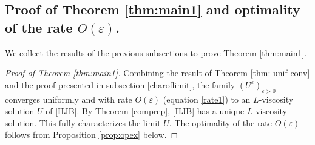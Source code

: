 \documentclass[reqno,11pt]{amsart}
\numberwithin{equation}{section}
\newcommand{\be}{\begin{equation}}
\newcommand{\ee}{\end{equation}}
\newcommand{\e}{\varepsilon}
\newcommand{\nd}{\noindent}
\renewcommand{\hat}{\widehat}
\begin{document}

\subsection{Proof of Theorem \ref{thm:main1} and optimality of the rate $O(\e)$.}\label{proofmain1}


\nd
We collect the results of the previous subsections to prove Theorem \ref{thm:main1}.

\begin{proof}[Proof of Theorem \ref{thm:main1}]
    Combining the result of Theorem \ref{thm: unif conv} and the proof presented in subsection \ref{charoflimit}, the family $(U^\e)_{\e>0}$ converges uniformly and with rate $O(\e)$ (equation \eqref{rate1}) to an $L$-viscosity solution $U$ of \eqref{HJB}. By Theorem \ref{comprep}, \eqref{HJB} has a unique $L$-viscosity solution. This fully characterizes the limit $U$. The optimality of the rate $O(\e)$ follows from Proposition \ref{prop:opex} below.
\end{proof}
\end{document}
